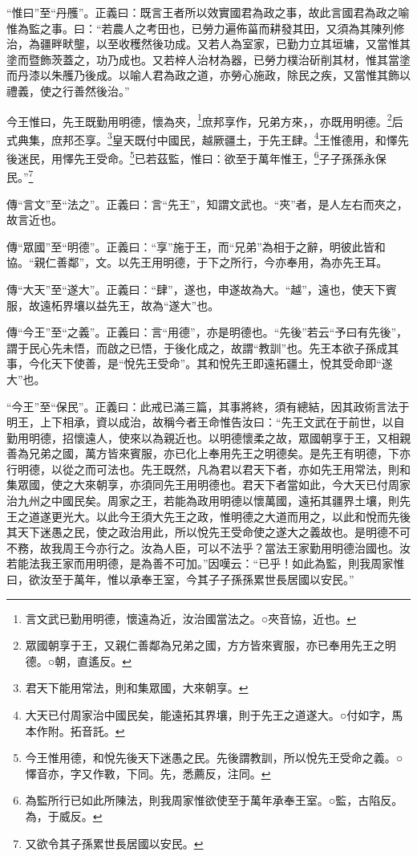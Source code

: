 {\noindent\shu{}\fzkt “惟曰”至“丹雘”。正義曰：既言王者所以效實國君為政之事，故此言國君為政之喻惟為監之事。曰：“若農人之考田也，已勞力遍佈菑而耕發其田，又須為其陳列修治，為疆畔畎壟，以至收穫然後功成。又若人為室家，已勤力立其垣墉，又當惟其塗而暨飾茨蓋之，功乃成也。又若梓人治材為器，已勞力樸治斫削其材，惟其當塗而丹漆以朱雘乃後成。以喻人君為政之道，亦勞心施政，除民之疾，又當惟其飾以禮義，使之行善然後治。” \par}

今王惟曰，先王既勤用明德，懷為夾，\footnote{言文武已勤用明德，懷遠為近，汝治國當法之。○夾音協，近也。}庶邦享作，兄弟方來，，亦既用明德。\footnote{眾國朝享于王，又親仁善鄰為兄弟之國，方方皆來賓服，亦已奉用先王之明德。○朝，直遙反。}后式典集，庶邦丕享。\footnote{君天下能用常法，則和集眾國，大來朝享。}皇天既付中國民，越厥疆土，于先王肆。\footnote{大天已付周家治中國民矣，能遠拓其界壤，則于先王之道遂大。○付如字，馬本作附。拓音託。}王惟德用，和懌先後迷民，用懌先王受命。\footnote{今王惟用德，和悅先後天下迷愚之民。先後謂教訓，所以悅先王受命之義。○懌音亦，字又作斁，下同。先，悉薦反，注同。}已若茲監，惟曰：欲至于萬年惟王，\footnote{為監所行已如此所陳法，則我周家惟欲使至于萬年承奉王室。○監，古陷反。為，于威反。}子子孫孫永保民。”\footnote{又欲令其子孫累世長居國以安民。}

{\noindent\zhuan{}\fzbyks 傳“言文”至“法之”。正義曰：言“先王”，知謂文武也。“夾”者，是人左右而夾之，故言近也。 \par}

{\noindent\zhuan{}\fzbyks 傳“眾國”至“明德”。正義曰：“享”施于王，而“兄弟”為相于之辭，明彼此皆和協。“親仁善鄰”，文。以先王用明德，于下之所行，今亦奉用，為亦先王耳。 \par}

{\noindent\zhuan{}\fzbyks 傳“大天”至“遂大”。正義曰：“肆”，遂也，申遂故為大。“越”，遠也，使天下賓服，故遠柘界壤以益先王，故為“遂大”也。 \par}

{\noindent\zhuan{}\fzbyks 傳“今王”至“之義”。正義曰：言“用德”，亦是明德也。“先後”若云“予曰有先後”，謂于民心先未悟，而啟之已悟，于後化成之，故謂“教訓”也。先王本欲子孫成其事，今化天下使善，是“悅先王受命”。其和悅先王即遠拓疆土，悅其受命即“遂大”也。 \par}

{\noindent\shu{}\fzkt “今王”至“保民”。正義曰：此戒已滿三篇，其事將終，須有總結，因其政術言法于明王，上下相承，資以成治，故稱今者王命惟告汝曰：“先王文武在于前世，以自勤用明德，招懷遠人，使來以為親近也。以明德懷柔之故，眾國朝享于王，又相親善為兄弟之國，萬方皆來賓服，亦已化上奉用先王之明德矣。是先王有明德，下亦行明德，以從之而可法也。先王既然，凡為君以君天下者，亦如先王用常法，則和集眾國，使之大來朝享，亦須同先王用明德也。君天下者當如此，今大天已付周家治九州之中國民矣。周家之王，若能為政用明德以懷萬國，遠拓其疆界土壤，則先王之道遂更光大。以此今王須大先王之政，惟明德之大道而用之，以此和悅而先後其天下迷愚之民，使之政治用此，所以悅先王受命使之遂大之義故也。是明德不可不務，故我周王今亦行之。汝為人臣，可以不法乎？當法王家勤用明德治國也。汝若能法我王家而用明德，是為善不可加。”因嘆云：“已乎！如此為監，則我周家惟曰，欲汝至于萬年，惟以承奉王室，今其子子孫孫累世長居國以安民。” \par}

